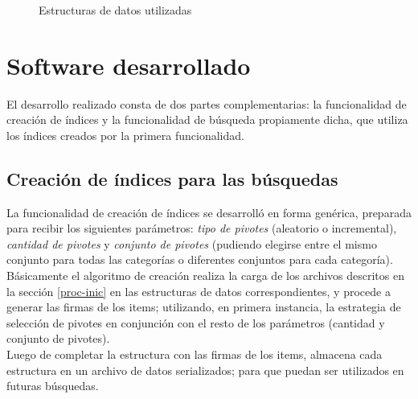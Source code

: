 \begin{figure}[H]
\centering
{}
    \caption{\small Estructuras de datos utilizadas}
    \label{fig:estructuras}
\end{figure}

\section{Software desarrollado}

El desarrollo realizado consta de dos partes complementarias: la funcionalidad de creaci\'on de \'indices y la funcionalidad de b\'usqueda propiamente dicha, que utiliza los \'indices creados por la primera funcionalidad.\\

\subsection{Creaci\'on de \'indices para las b\'usquedas}

La funcionalidad de creaci\'on de \'indices se desarroll\'o en forma gen\'erica, preparada para recibir los siguientes par\'ametros: \textit{tipo de pivotes} (aleatorio o incremental), \textit{cantidad de pivotes} y \textit{conjunto de pivotes} (pudiendo elegirse entre el mismo conjunto para todas las categor\'ias o diferentes conjuntos para cada categor\'ia).\\

B\'asicamente el algoritmo de creaci\'on realiza la carga de los archivos descritos en la secci\'on  \ref{proc-inic} en las estructuras de datos correspondientes, y procede a generar las firmas de los items; utilizando, en primera instancia, la estrategia de selecci\'on de pivotes en conjunci\'on con el resto de los par\'ametros (cantidad y conjunto de pivotes).\\

Luego de completar la estructura con las firmas de los items, almacena cada estructura en un archivo de datos serializados; para que puedan ser utilizados en futuras b\'usquedas.\\

